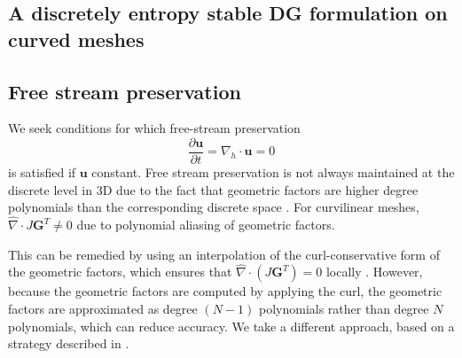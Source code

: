 \documentclass[preprint,10pt]{article}
\theoremstyle{definition}
\theoremstyle{lemma}
\theoremstyle{theorem}
\theoremstyle{assumption}
\renewcommand{\hat}{\widehat}
\newcommand{\pd}[2]{\frac{\partial#1}{\partial#2}}
\newcommand{\LRp}[1]{\left( #1 \right)}
\newcommand{\Grad} {\ensuremath{\nabla}}
\begin{document}
{\subsection{A discretely entropy stable DG formulation on curved meshes}

\subsection{Free stream preservation}

We seek conditions for which free-stream preservation 
\[
\pd{\bm{u}}{t} = \Grad_h \cdot \bm{u} = 0
\]
is satisfied if $\bm{u}$ constant.  Free stream preservation is not always maintained at the discrete level in 3D due to the fact that geometric factors are higher degree polynomials than the corresponding discrete space \cite{kopriva2006metric, johnen2013geometrical}.  For curvilinear meshes, $\hat{\Grad}\cdot{J\bm{G}^T} \neq 0$ due to polynomial aliasing of geometric factors.  

This can be remedied by using an interpolation of the curl-conservative form of the geometric factors, which ensures that $\hat{\Grad}\cdot\LRp{J\bm{G}^T} = 0$ locally \cite{visbal2002use, kopriva2006metric}.  However, because the geometric factors are computed by applying the curl, the geometric factors are approximated as degree $(N-1)$ polynomials rather than degree $N$ polynomials, which can reduce accuracy.  We take a different approach, based on a strategy described in \cite{fernandez2016simultaneous, crean2018entropy}.  

}
\end{document}

